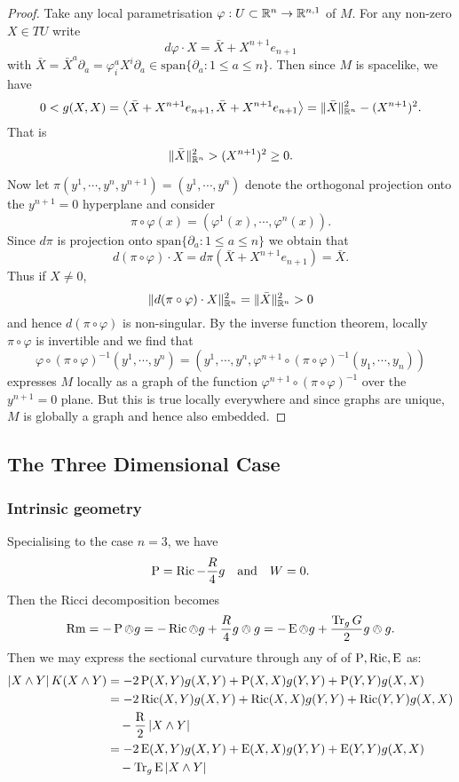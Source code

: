 \documentclass[a4paper, 12pt]{amsart}
\begin{document}
\begin{proof}
Take any local parametrisation \(\varphi : U \subset \mathbb{R}^n \to \mathbb{R}^{n,1}\) of \(M\). For any non-zero \(X \in TU\) write
\[
d\varphi \cdot X = \bar{X} + X^{n+1} e_{n+1}
\]
with \(\bar{X} = \bar{X}^a \partial_a = \varphi^a_i X^i \partial_a \in \text{span} \{\partial_a : 1 \leq a \leq n\}\). Then since \(M\) is spacelike, we have
\[
0 < g(X, X) = \left\langle \bar{X} + X^{n+1} e_{n+1},\bar{X} + X^{n+1} e_{n+1} \right\rangle = \|\bar{X}\|_{\mathbb{R}^n}^2 - (X^{n+1})^2.
\]
That is
\[
\|\bar{X}\|_{\mathbb{R}^n}^2 > (X^{n+1})^2 \geq 0.
\]

Now let \(\pi(y^1, \cdots, y^n, y^{n+1}) = (y^1, \cdots, y^n)\) denote the orthogonal projection onto the \(y^{n+1} = 0\) hyperplane and consider
\[
\pi \circ \varphi (x) = (\varphi^1(x), \cdots, \varphi^n(x)).
\]
Since \(d \pi\) is projection onto \(\text{span} \{\partial_a : 1 \leq a \leq n\}\) we obtain that
\[
d(\pi \circ \varphi) \cdot X = d\pi (\bar{X} + X^{n+1} e_{n+1}) = \bar{X}.
\]
Thus if \(X \ne 0\),
\[
\|d(\pi \circ \varphi) \cdot X\|_{\mathbb{R}^n}^2 = \|\bar{X}\|_{\mathbb{R}^n}^2 > 0
\]
and hence \(d(\pi \circ \varphi)\) is non-singular. By the inverse function theorem, locally \(\pi \circ \varphi\) is invertible and we find that
\[
\varphi \circ (\pi \circ \varphi)^{-1} (y^1, \cdots, y^n) = (y^1, \cdots, y^n, \varphi^{n+1} \circ (\pi \circ \varphi)^{-1} (y_1, \cdots, y_n))
\]
expresses \(M\) locally as a graph of the function \(\varphi^{n+1} \circ (\pi \circ \varphi)^{-1}\) over the \(y^{n+1} = 0\) plane. But this is true locally everywhere and since graphs are unique, \(M\) is globally a graph and hence also embedded.
\end{proof}


\subsection{The Three Dimensional Case}
\label{subsec:notation_threedim}

\subsubsection{Intrinsic geometry}

Specialising to the case \(n = 3\), we have
\[
\operatorname{P} = \operatorname{Ric} - \frac{R}{4} g \quad \text{and} \quad W = 0.
\]
Then the Ricci decomposition becomes
\[
\operatorname{Rm} = -\operatorname{P} \owedge g = -\operatorname{Ric} \owedge g + \frac{R}{4} g \owedge g = -\operatorname{E} \owedge g + \frac{\operatorname{Tr}_g G}{2} g \owedge g.
\]
Then we may express the sectional curvature through any of of \(\operatorname{P}, \operatorname{Ric}, \operatorname{E}\) as:
\begin{align*}
\left\lvert{X \wedge Y}\right\rvert K(X \wedge Y) &= -2\operatorname{P}(X, Y) g(X, Y) + \operatorname{P}(X, X) g(Y, Y) + \operatorname{P}(Y, Y) g(X, X) \\
&= -2\operatorname{Ric}(X, Y) g(X, Y) + \operatorname{Ric}(X, X) g(Y, Y) + \operatorname{Ric}(Y, Y) g(X, X) \\
&\quad - \frac{\operatorname{R}}{2} \left\lvert{X \wedge Y}\right\rvert \\
&= -2\operatorname{E}(X, Y) g(X, Y) + \operatorname{E}(X, X) g(Y, Y) + \operatorname{E}(Y, Y) g(X, X) \\
&\quad - \operatorname{Tr}_g \operatorname{E} \left\lvert{X \wedge Y}\right\rvert \\
\end{align*}
\end{document}
